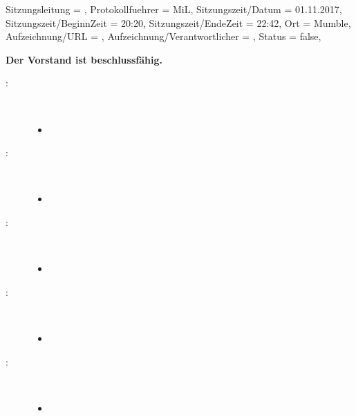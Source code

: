 
\begin{Protokoll}{
		Sitzungsleitung                 = {}, 			%
		Protokollfuehrer                = {MiL},  			%
		Sitzungszeit/Datum              = {01.11.2017},   	%
		Sitzungszeit/BeginnZeit         = {20:20},			%
		Sitzungszeit/EndeZeit           = {22:42},			%
		Ort                             = {Mumble},			%
		Aufzeichnung/URL                = {},				%
		Aufzeichnung/Verantwortlicher   = {},		  	    %
		Status                          = {false},			%
	}
	
	
	    
	
	
	\begin{Anwesenheitsliste}
	\end{Anwesenheitsliste}
	
	\textbf{Der Vorstand ist beschlussfähig.}
	
	
	
	\begin{description}
		\item[:] \     
		\begin{itemize}
			\item
		\end{itemize}
		\item[:] \     
		\begin{itemize}
			\item 
		\end{itemize}
		\item[:] \     
		\begin{itemize}
			\item 
		\end{itemize}
		\item[:] \     
		\begin{itemize}
			\item
		\end{itemize}
		\item[\getPersonAsWebsiteLink{FeW}:] \     
		\begin{itemize}
			\item 
		\end{itemize}
	\end{description}


\end{Protokoll}
